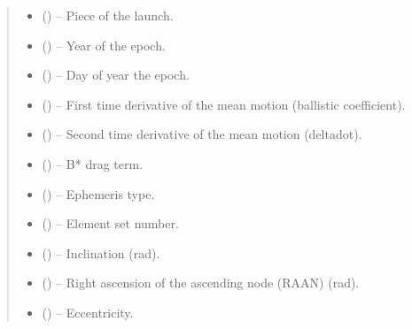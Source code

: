 \documentclass[letterpaper,10pt,english]{sphinxmanual}
\begin{document}
\begin{fulllineitems}
\begin{quote}
\begin{description}
\begin{itemize}
\item {} 
\sphinxAtStartPar
{} () – Piece of the launch.

\item {} 
\sphinxAtStartPar
{} () – Year of the epoch.

\item {} 
\sphinxAtStartPar
{} () – Day of year the epoch.

\item {} 
\sphinxAtStartPar
{} () – First time derivative of the mean motion (ballistic coefficient).

\item {} 
\sphinxAtStartPar
{} () – Second time derivative of the mean motion (delta\sphinxhyphen{}dot).

\item {} 
\sphinxAtStartPar
{} () – B* drag term.

\item {} 
\sphinxAtStartPar
{} () – Ephemeris type.

\item {} 
\sphinxAtStartPar
{} () – Element set number.

\item {} 
\sphinxAtStartPar
{} () – Inclination (rad).

\item {} 
\sphinxAtStartPar
{} () – Right ascension of the ascending node (RAAN) (rad).

\item {} 
\sphinxAtStartPar
{} () – Eccentricity.


\end{itemize}
\end{description}
\end{quote}
\end{fulllineitems}
\end{document}
